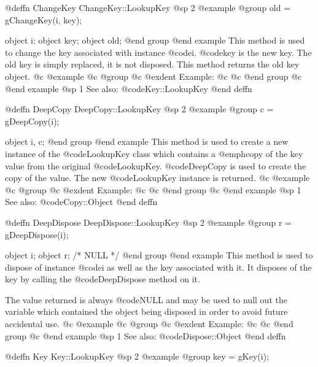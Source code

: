 @deffn {ChangeKey} ChangeKey::LookupKey
@sp 2
@example
@group
old = gChangeKey(i, key);

object  i;
object  key;
object  old;
@end group
@end example
This method is used to change the key associated with instance @code{i}.
@code{key} is the new key.  The old key is simply replaced, it is not
disposed.  This method returns the old key object.
@c @example
@c @group
@c @exdent Example:
@c 
@c @end group
@c @end example
@sp 1
See also:  @code{Key::LookupKey}
@end deffn













@deffn {DeepCopy} DeepCopy::LookupKey
@sp 2
@example
@group
c = gDeepCopy(i);

object  i, c;
@end group
@end example
This method is used to create a new instance of the
@code{LookupKey} class which contains a @emph{copy} of the
key value from the original @code{LookupKey}.  @code{DeepCopy} is
used to create the copy of the value.  The new
@code{LookupKey} instance is returned.
@c @example
@c @group
@c @exdent Example:
@c 
@c @end group
@c @end example
@sp 1
See also:  @code{Copy::Object}
@end deffn













@deffn {DeepDispose} DeepDispose::LookupKey
@sp 2
@example
@group
r = gDeepDispose(i);

object  i;
object  r;     /*  NULL  */
@end group
@end example
This method is used to dispose of instance @code{i} as well as the key
associated with it.  It disposes of the key by calling the
@code{DeepDispose} method on it.

The value returned is always @code{NULL} and may be used to null out
the variable which contained the object being disposed in order to
avoid future accidental use.
@c @example
@c @group
@c @exdent Example:
@c 
@c @end group
@c @end example
@sp 1
See also:  @code{Dispose::Object}
@end deffn








@deffn {Key} Key::LookupKey
@sp 2
@example
@group
key = gKey(i);

